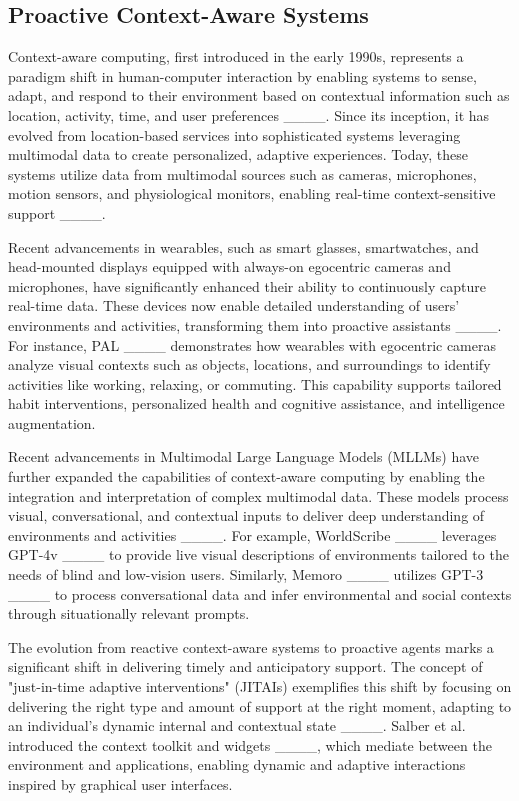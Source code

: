 


\subsection{Proactive Context-Aware Systems}
Context-aware computing, first introduced in the early 1990s, represents a paradigm shift in human-computer interaction by enabling systems to sense, adapt, and respond to their environment based on contextual information such as location, activity, time, and user preferences ____. Since its inception, it has evolved from location-based services into sophisticated systems leveraging multimodal data to create personalized, adaptive experiences. Today, these systems utilize data from multimodal sources such as cameras, microphones, motion sensors, and physiological monitors, enabling real-time context-sensitive support ____.

Recent advancements in wearables, such as smart glasses, smartwatches, and head-mounted displays equipped with always-on egocentric cameras and microphones, have significantly enhanced their ability to continuously capture real-time data. These devices now enable detailed understanding of users' environments and activities, transforming them into proactive assistants ____. For instance, PAL ____ demonstrates how wearables with egocentric cameras analyze visual contexts such as objects, locations, and surroundings to identify activities like working, relaxing, or commuting. This capability supports tailored habit interventions, personalized health and cognitive assistance, and intelligence augmentation.

Recent advancements in Multimodal Large Language Models (MLLMs) have further expanded the capabilities of context-aware computing by enabling the integration and interpretation of complex multimodal data. These models process visual, conversational, and contextual inputs to deliver deep understanding of environments and activities ____. For example, WorldScribe ____ leverages GPT-4v ____ to provide live visual descriptions of environments tailored to the needs of blind and low-vision users. Similarly, Memoro ____ utilizes GPT-3 ____ to process conversational data and infer environmental and social contexts through situationally relevant prompts.

The evolution from reactive context-aware systems to proactive agents marks a significant shift in delivering timely and anticipatory support. The concept of "just-in-time adaptive interventions" (JITAIs) exemplifies this shift by focusing on delivering the right type and amount of support at the right moment, adapting to an individual’s dynamic internal and contextual state ____. Salber et al. introduced the context toolkit and widgets ____, which mediate between the environment and applications, enabling dynamic and adaptive interactions inspired by graphical user interfaces.

